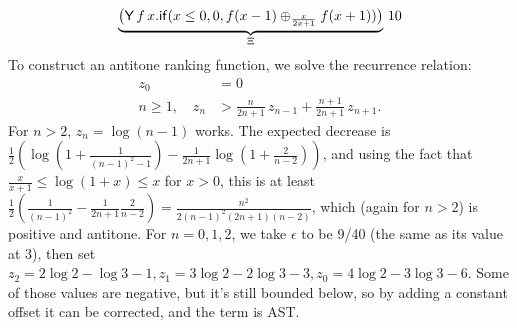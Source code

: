 \begin{example}
\label{ex:Fair-in-the-limit random walk}\citep[\S 5.3]{DBLP:journals/pacmpl/McIverMKK18}
\[
\underbrace{\big
(\mathsf{Y} \, f \, x . 
\mathsf{if}(x \leq 0, 0, f(x - 1) \oplus_{\frac{x}{2x+1}} f(x + 1)) \big)}_{\Xi} 
\, 10
\]
To construct an antitone ranking function, we solve the recurrence relation:
\begin{align*}
z_0 &= 0\\
n \geq 1, \quad z_n &> \textstyle \frac{n}{2n + 1} \, z_{n-1} + \frac{n+1}{2n + 1} \, z_{n+1}.
\end{align*}
For $n > 2$, $z_n = \log(n-1)$ works. The expected decrease is $\frac 1 2(\log(1+\frac 1 {(n-1)^2-1}) - \frac 1 {2n+1} \log(1 + \frac 2 {n-2}))$, and using the fact that $\frac x {x+1} \leq \log (1+x) \leq x$ for $x > 0$,
 this is at least $\frac 1 2(\frac 1 {(n-1)^2} - \frac 1 {2n + 1} \frac 2 {n-2}) = \frac {n^2}{2(n-1)^2(2n+1)(n-2)}$, which (again for $n > 2$) is positive and antitone. For $n = 0, 1, 2$, we take $\epsilon$ to be 9/40 (the same as its value at 3), then set $z_2 = 2 \log 2 - \log 3 - 1, z_1 = 3 \log 2 - 2 \log 3 - 3, z_0 = 4 \log 2 - 3 \log 3 - 6$. Some of those values are negative, but it's still bounded below, so by adding a constant offset it can be corrected, and the term is AST.

\end{example}

